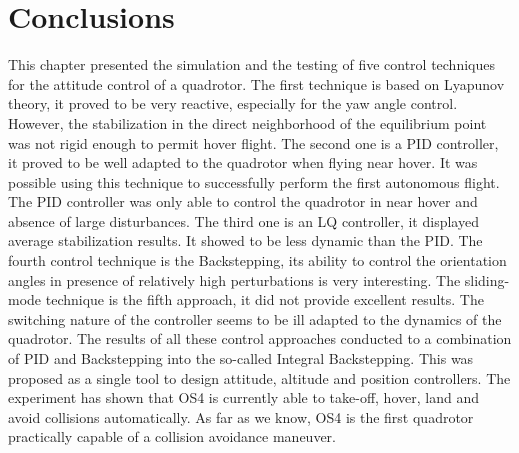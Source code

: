 \section{Conclusions}
This chapter presented the simulation and the testing of five control techniques
for the attitude control of a quadrotor. The first technique is based
on Lyapunov theory, it proved to be very reactive, especially for the yaw
angle control. However, the stabilization in the direct neighborhood of the
equilibrium point was not rigid enough to permit hover flight. The second
one is a PID controller, it proved to be well adapted to the quadrotor when
flying near hover. It was possible using this technique to successfully perform
the first autonomous flight. The PID controller was only able to control the
quadrotor in near hover and absence of large disturbances. The third one
is an LQ controller, it displayed average stabilization results. It showed to
be less dynamic than the PID. The fourth control technique is the Backstepping,
its ability to control the orientation angles in presence of relatively
high perturbations is very interesting. The sliding-mode technique is the fifth
approach, it did not provide excellent results. The switching nature of the
controller seems to be ill adapted to the dynamics of the quadrotor. The results
of all these control approaches conducted to a combination of PID and
Backstepping into the so-called Integral Backstepping. This was proposed
as a single tool to design attitude, altitude and position controllers. The
experiment has shown that OS4 is currently able to take-off, hover, land and
avoid collisions automatically. As far as we know, OS4 is the first quadrotor
practically capable of a collision avoidance maneuver.